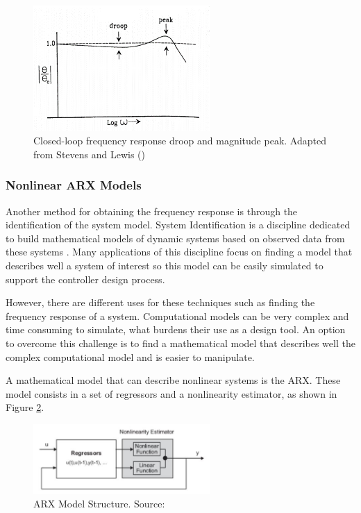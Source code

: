 \begin{figure}[H]
	\centering
	\centerline{\includegraphics[width=0.6\textwidth]{Figuras/2.TheoryBackground/drooppeak.png}}
	\caption{Closed-loop frequency response droop and magnitude peak. Adapted from Stevens and Lewis (\citeyear{Lewis})}
	\label{fig:2_2_2_DroopPeak}
\end{figure}

\subsubsection{Nonlinear ARX Models}

Another method for obtaining the frequency response is through the identification of the system model. System Identification is a discipline dedicated to build mathematical models of dynamic systems based on observed data from these systems \cite{Ljung}. Many applications of this discipline focus on finding a model that describes well a system of interest so this model can be easily simulated to support the controller design process.

However, there are different uses for these techniques such as finding the frequency response of a system. Computational models can be very complex and time consuming to simulate, what burdens their use as a design tool. An option to overcome this challenge is to find a mathematical model that describes well the complex computational model and is easier to manipulate.

A mathematical model that can describe nonlinear systems is the ARX. These model consists in a set of regressors and a nonlinearity estimator, as shown in Figure \ref{fig:2_4_ARXModel}. 

\begin{figure}[H]
	\centering
	\centerline{\includegraphics[width=0.6\textwidth]{Figuras/2.TheoryBackground/2-4-ARXModel.jpg}}
	\caption{ARX Model Structure. Source: }
	\label{fig:2_4_ARXModel}
\end{figure}

